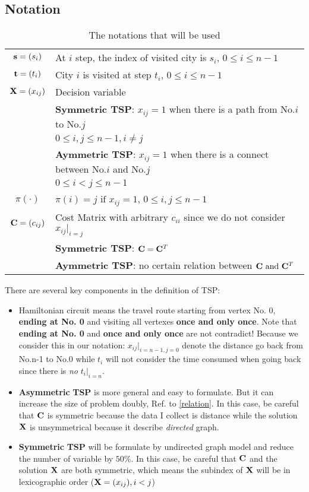 \documentclass{mcmthesis}
\begin{document}
\subsection{Notation}	 
\begin{table}[H]
	\centering
	{\begin{tabular}{c|l} 
	\hline
	$\mathbf{s} = (s_i)$ & At $i$ step, the index of visited city is $s_i$, $ 0 \le i \le n-1$\\
	$\mathbf{t}= (t_i)$ & City $i$ is visited at step $t_i$, $ 0 \le i \le n-1$\\ \hline \hline
	$\mathbf{X} = (x_{i j} )$ & Decision variable   \\
	& \textbf{Symmetric TSP}:  $x_{ij}=1$ when there is a path  from No.$i$ to No.$j$ \\
	& \qquad\qquad\qquad\qquad $0 \le i,j \le n-1, i\ne j$ \\
	& \textbf{Aymmetric TSP}:  $x_{ij}=1$ when there is a connect between  No.$i$ and No.$j$\\
	& \qquad\qquad\qquad\qquad  $0 \le i<j \le n-1 $ \\ \hline \hline
	$\pi(\cdot )$ & $\pi(i)=j  \text{ if } x_{i j}=1$, $ 0 \le i,j \le n-1$ \\ \hline \hline
	$\mathbf{C}=(c_{ij})$ & Cost Matrix with arbitrary  $c_{ii}$  since we do not consider $x_{ij}|_{i=j}$ \\ 
	& \textbf{Symmetric TSP}:  $\mathbf{C}=\mathbf{C}^T$ \\
	&  \textbf{Aymmetric TSP}: no certain relation between  $\mathbf{C} \text{ and } \mathbf{C}^T$ \\
	\hline
	\end{tabular}
	\caption{The notations that will be used}
	\label{tab:ok}}
\end{table}

There are several key components in the definition of TSP:
\begin{itemize}[noitemsep,nolistsep]
	\item Hamiltonian circuit means the travel route starting from vertex No. 0, \textbf{ending at No. 0} and visiting all vertexes \textbf{once and only once}. Note that \textbf{ending at No. 0} and  \textbf{once and only once} are not contradict! Because we consider this in our notation: $x_{ij}|_{i=n-1,j=0}$ denote the distance  go back from No.n-1 to No.0 while  $t_i$ will not consider the time consumed when going back since there is \textit{no} $t_i|_{i=n}$.
	\item  \textbf{Asymmetric} \textbf{TSP} is more general and easy to formulate. But it can increase the size of problem doubly, Ref. to \vref{relation}. In this case,  be careful that $\mathbf{C}$ is symmetric because the data I collect is distance while the solution $\mathbf{X}$ is unsymmetrical because it describe \textit{directed} graph.
	\item \textbf{Symmetric} \textbf{TSP} will be formulate by undirected graph model and reduce the number of variable by $50\%$. In this case, be careful that $\mathbf{C}$ and the solution $\mathbf{X}$ are both symmetric, which means the subindex of  $\mathbf{X}$  will be in lexicographic order (\ie $\mathbf{X} = (x_{i j} ), i<j$)
\end{itemize} 
\end{document}
